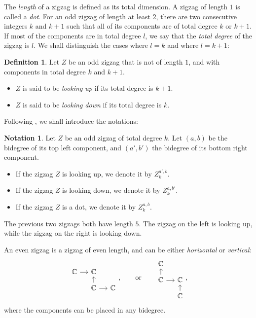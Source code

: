 \documentclass[leqno]{article}
\theoremstyle{definition}
\newtheorem{Definition}[equation]{Definition}
\newtheorem{Notation}[equation]{Notation}
\numberwithin{equation}{section}
\begin{document}
The {\sl length} of a zigzag is defined as its total dimension. A zigzag of length $1$ is called a {\sl dot}. For an odd zigzag of length at least $2$, there are two consecutive integers $k$ and $k+1$ such that all of its components are of total degree $k$ or $k+1$. If most of the components are in total degree $l$, we say that the {\sl total degree} of the zigzag is $l$. We shall distinguish the cases where $l = k$ and where $l = k+1$:
\begin{Definition}
\label{odd_zigzags}
Let $Z$ be an odd zigzag that is not of length $1$, and with components in total degree $k$ and $k+1$.
\begin{itemize}
\item $Z$ is said to be {\sl looking up} if its total degree is $k+1$.
\item $Z$ is said to be {\sl looking down} if its total degree is $k$.
\end{itemize}
\end{Definition}

Following \cite{Ste}, we shall introduce the notations:

\begin{Notation}
\label{notations_zigzags}
Let $Z$ be an odd zigzag of total degree $k$. Let $(a, b)$ be the bidegree of its top left component, and $(a', b')$ the bidegree of its bottom right component.
\begin{itemize}
\item If the zigzag $Z$ is looking up, we denote it by $Z^{a', b}_{k}$.
\item If the zigzag $Z$ is looking down, we denote it by $Z^{a, b'}_k$.
\item If the zigzag $Z$ is a dot, we denote it by $Z^{a, b}_k$.
\end{itemize}
\end{Notation}

The previous two zigzags both have length $5$. The zigzag on the left is looking up, while the zigzag on the right is looking down.

An even zigzag is a zigzag of even length, and can be either {\sl horizontal} or {\sl vertical}:
\[
\begin{tikzcd}[row sep=small, column sep = small]
\mathbb{C}\arrow[r] & \mathbb{C} & \\
& \mathbb{C} \arrow[u] \arrow[r] & \mathbb{C}
\end{tikzcd},
\quad \quad
\text{or} 
\quad \quad
\begin{tikzcd}[row sep=small, column sep = small]
\mathbb{C} & \\
\mathbb{C} \arrow[u] \arrow[r] & \mathbb{C} \\
& \mathbb{C} \arrow[u]
\end{tikzcd},
\]
where the components can be placed in any bidegree.
\end{document}
